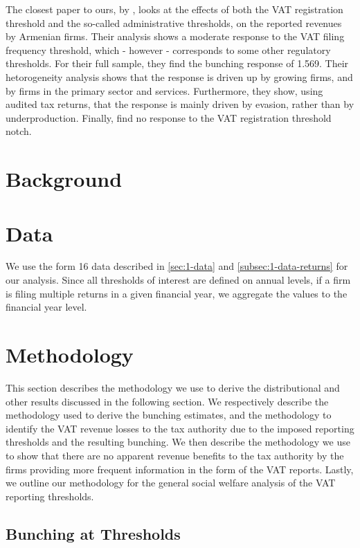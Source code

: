 The closest paper to ours, by \citet{asatryan2017responses}, looks at the effects of both the VAT registration threshold and the so-called administrative thresholds, on the reported revenues by Armenian firms. Their analysis shows a moderate response to the VAT filing frequency threshold, which - however - corresponds to some other regulatory thresholds. For their full sample, they find the bunching response of 1.569. Their hetorogeneity analysis shows that the response is driven up by growing firms, and by firms in the primary sector and services. Furthermore, they show, using audited tax returns, that the response is mainly driven by evasion, rather than by underproduction. Finally, \citet{asatryan2017responses} find no response to the VAT registration threshold notch. 



\section{Background}
\label{sec:background}

\section{Data}
\label{sec:3-data}
We use the form 16 data described in \cref{sec:1-data} and \cref{subsec:1-data-returns} for our analysis. Since all thresholds of interest are defined on annual levels, if a firm is filing multiple returns in a given financial year, we aggregate the values to the financial year level. 



\section{Methodology}
\label{sec:methodology}
This section describes the methodology we use to derive the distributional
and other results discussed in the following section. We respectively
describe the methodology used to derive the bunching estimates, and
the methodology to identify the VAT revenue losses to the tax authority
due to the imposed reporting thresholds and the resulting bunching.
We then describe the methodology we use to show that there are no
apparent revenue benefits to the tax authority by the firms providing
more frequent information in the form of the VAT reports. Lastly,
we outline our methodology for the general social welfare analysis
of the VAT reporting thresholds.

\subsection{Bunching at Thresholds}
\label{subsec:methodology-bunching}

